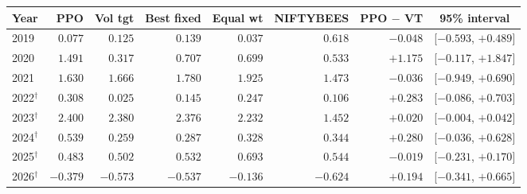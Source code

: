 \begin{tabular}{lrrrrrrc}
\toprule
Year & PPO & Vol tgt & Best fixed & Equal wt & NIFTYBEES & PPO $-$ VT & 95\% interval \\
\midrule
2019 & $0.077$ & $0.125$ & $0.139$ & $0.037$ & $0.618$ & $-0.048$ & [$-0.593$, $+0.489$] \\
2020 & $1.491$ & $0.317$ & $0.707$ & $0.699$ & $0.533$ & $+1.175$ & [$-0.117$, $+1.847$] \\
2021 & $1.630$ & $1.666$ & $1.780$ & $1.925$ & $1.473$ & $-0.036$ & [$-0.949$, $+0.690$] \\
2022$^\dagger$ & $0.308$ & $0.025$ & $0.145$ & $0.247$ & $0.106$ & $+0.283$ & [$-0.086$, $+0.703$] \\
2023$^\dagger$ & $2.400$ & $2.380$ & $2.376$ & $2.232$ & $1.452$ & $+0.020$ & [$-0.004$, $+0.042$] \\
2024$^\dagger$ & $0.539$ & $0.259$ & $0.287$ & $0.328$ & $0.344$ & $+0.280$ & [$-0.036$, $+0.628$] \\
2025$^\dagger$ & $0.483$ & $0.502$ & $0.532$ & $0.693$ & $0.544$ & $-0.019$ & [$-0.231$, $+0.170$] \\
2026$^\dagger$ & $-0.379$ & $-0.573$ & $-0.537$ & $-0.136$ & $-0.624$ & $+0.194$ & [$-0.341$, $+0.665$] \\
\bottomrule
\end{tabular}
